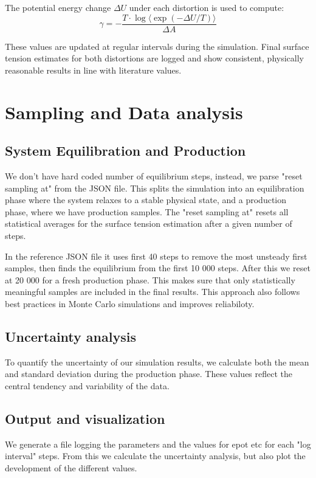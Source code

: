\documentclass{article}
\begin{document}
The potential energy change $\Delta U$ under each distortion is used to compute:
\[
\gamma = -\frac{T \cdot \log \langle \exp(-\Delta U / T) \rangle}{\Delta A}
\]

These values are updated at regular intervals during the simulation. Final surface tension estimates for both distortions are logged and show consistent, physically reasonable results in line with literature values.

\section*{Sampling and Data analysis}

\subsection*{System Equilibration and Production}

We don't have hard coded number of equilibrium steps, instead, we parse "reset sampling at" from the JSON file. This splits the simulation into an equilibration phase where the system relaxes to a stable physical state, and a production phase, where we have production samples. The "reset sampling at" resets all statistical averages for the surface tension estimation after a given number of steps.

In the reference JSON file it uses first 40 steps to remove the most unsteady first samples, then finds the equilibrium from the first 10 000 steps. After this we reset at 20 000 for a fresh production phase. This makes sure that only statistically meaningful samples are included in the final results. This approach also follows best practices in Monte Carlo simulations and improves reliabiloty.

\subsection*{Uncertainty analysis}

To quantify the uncertainty of our simulation results, we calculate both the mean and standard deviation during the production phase. These values reflect the central tendency and variability of the data.

\subsection*{Output and visualization}

We generate a file logging the parameters and the values for epot etc for each "log interval" steps. From this we calculate the uncertainty analysis, but also plot the development of the different values.
\end{document}
